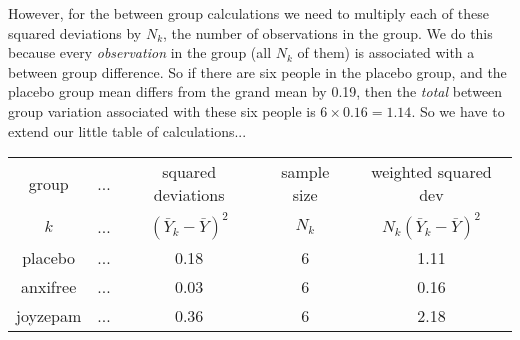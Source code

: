 \noindent
However, for the between group calculations we need to multiply each of these squared deviations by $N_k$, the number of observations in the group. We do this because every {\it observation} in the group (all $N_k$ of them) is associated with a between group difference. So if there are six people in the placebo group, and the placebo group mean differs from the grand mean by 0.19, then the {\it total} between group variation associated with these six people is $6 \times 0.16 = 1.14$. So we have to extend our little table of calculations...

\small
\vspace*{6pt}
\begin{tabular}{c|c |c|c|c}
 group & \hspace{.25cm}...\hspace{.25cm} & squared deviations & sample size & weighted squared dev\\  
  $k$  & ... & $(\bar{Y}_{k} - \bar{Y})^2$ & $N_k$ & $N_k (\bar{Y}_{k} - \bar{Y})^2$\\  \hline
placebo   & ... &  0.18 & 6 & 1.11\\
anxifree  & ... &  0.03 & 6 & 0.16\\
joyzepam  & ... &  0.36 & 6 & 2.18\\
\end{tabular}
\vspace*{6pt}
\normalsize

